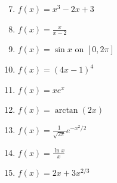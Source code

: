 \documentclass[12pt]{article}
\newif\ifans
\begin{document}
\begin{enumerate}
\setcounter{enumi}{6}

\item $f(x) = x^3-2x+3$ 

\ifans{\fbox{a.$\left(-\infty, -\sqrt{\frac{2}{3}}\right)\cup \left(\sqrt{\frac{2}{3}}, \infty \right)$; b. $\left(-\sqrt{\frac{2}{3}},\sqrt{\frac{2}{3}}\right)$; c. $(0,\infty)$; d. $(-\infty,0)$; e. $(0,0)$}} \fi

\item $f(x) = \frac{x}{x-2}$ 

\ifans{\fbox{a. none; b. $(-\infty,2) \cup (2,\infty)$; c. $(2,\infty)$; d. $(-\infty, 2)$; e. none}} \fi

\item $f(x) = \sin{x} \text{ on } [0,2\pi]$ 

\ifans{\fbox{a. $\left[0, \frac{\pi}{2}\right)\cup \left(\frac{3\pi}{2},2\pi \right)$; b. $ \left(\frac{\pi}{2}, \frac{3\pi}{2} \right)$; c. $(\pi, 2\pi)$; d. $(0,2\pi)$; e. $(\pi,0)$}} \fi

\item $f(x) = (4x-1)^4$ 

\ifans{\fbox{a.$\left(\frac{1}{4},\infty \right)$; b. $\left(-\infty, \frac{1}{4}\right)$; c. $\left(-\infty,\frac{1}{4}\right) \cup \left(\frac{1}{4},\infty \right)$; d. none; e. none}} \fi

\item $f(x) = xe^x$ 

\ifans{\fbox{a. $(-1, \infty)$; b. $(-\infty, -1)$; c. $(-2,\infty)$; d. $(-\infty, -2)$; e. $\left(-2,-\frac{2}{e^2}\right)$}} \fi

\item $f(x) = \arctan{(2x)}$ 

\ifans{\fbox{a. $(-\infty,\infty)$; b. none; c. $(-\infty,0)$; d. $(0,\infty)$; e. $(0,0)$}} \fi

\item $f(x)=\frac{1}{\sqrt{2\pi}}e^{-x^2/2}$

\item $f(x)=\frac{\ln{x}}{x}$

\item $f(x)=2x+3x^{2/3}$

\end{enumerate}

\end{document}
